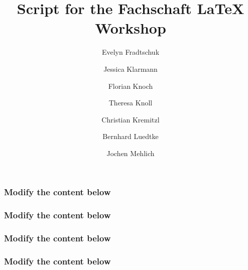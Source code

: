 
\title{Script for the Fachschaft  \LaTeX{} Workshop}
\author{Evelyn Fradtschuk \and Jessica Klarmann \and Florian Knoch \and Theresa Knoll \and Christian Kremitzl \and Bernhard Luedtke \and Jochen Mehlich}


\frenchspacing

\renewcommand{\thesection}{E\arabic{section}}
\renewcommand{\thesubsection}{\arabic{subsection}}


\thispagestyle{empty}
\newpage
\setcounter{page}{1} %
\setcounter{tocdepth}{2}
\tableofcontents
\newpage



\setcounter{section}{1}


\subsubsection*{Modify the content below}


\newpage

\subsubsection*{Modify the content below}


\newpage

\subsubsection*{Modify the content below}


\newpage

\subsubsection*{Modify the content below}


